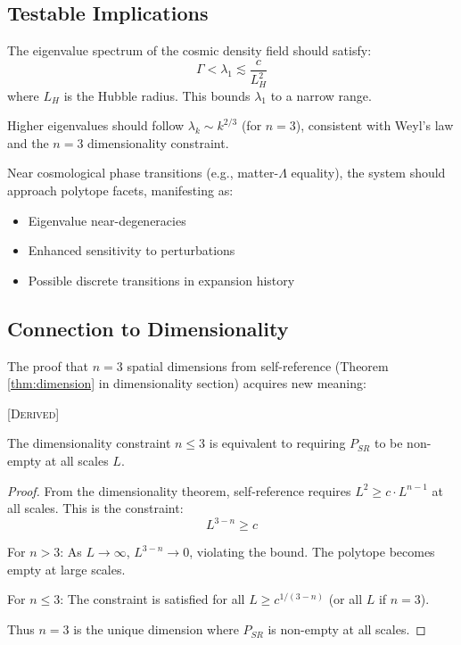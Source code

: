 \subsection{Testable Implications}

\begin{prediction}
The eigenvalue spectrum of the cosmic density field should satisfy:
\[
\Gamma < \lambda_1 \lesssim \frac{c}{L_H^2}
\]
where $L_H$ is the Hubble radius. This bounds $\lambda_1$ to a narrow range.
\end{prediction}

\begin{prediction}
Higher eigenvalues should follow $\lambda_k \sim k^{2/3}$ (for $n=3$), consistent with Weyl's law and the $n=3$ dimensionality constraint.
\end{prediction}

\begin{prediction}
Near cosmological phase transitions (e.g., matter-$\Lambda$ equality), the system should approach polytope facets, manifesting as:
\begin{itemize}
    \item Eigenvalue near-degeneracies
    \item Enhanced sensitivity to perturbations
    \item Possible discrete transitions in expansion history
\end{itemize}
\end{prediction}

\subsection{Connection to Dimensionality}

The proof that $n = 3$ spatial dimensions from self-reference (Theorem \ref{thm:dimension} in dimensionality section) acquires new meaning:

\begin{proposition}
\textsc{[Derived]}

The dimensionality constraint $n \leq 3$ is equivalent to requiring $P_{SR}$ to be non-empty at all scales $L$.
\end{proposition}

\begin{proof}
From the dimensionality theorem, self-reference requires $L^2 \geq c \cdot L^{n-1}$ at all scales. This is the constraint:
\[
L^{3-n} \geq c
\]

For $n > 3$: As $L \to \infty$, $L^{3-n} \to 0$, violating the bound. The polytope becomes empty at large scales.

For $n \leq 3$: The constraint is satisfied for all $L \geq c^{1/(3-n)}$ (or all $L$ if $n = 3$).

Thus $n = 3$ is the unique dimension where $P_{SR}$ is non-empty at all scales.
\end{proof}

